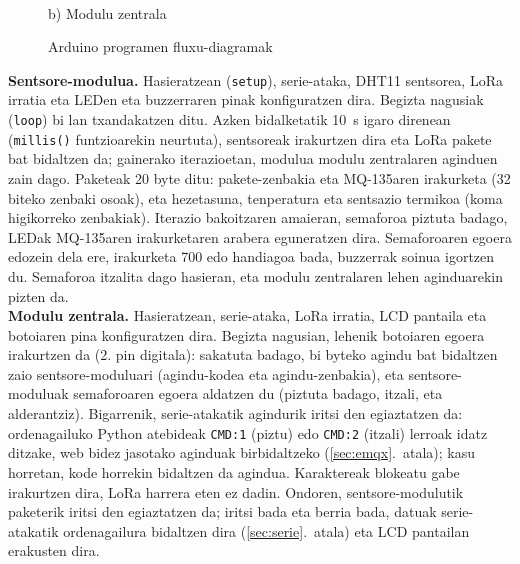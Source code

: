 \documentclass[10pt]{article}
\begin{document}
\begin{figure}[!htbp]
\begin{minipage}[t]{0.5\textwidth}
\\[1mm]
{\footnotesize b) Modulu zentrala}
\end{minipage}
\caption{Arduino programen fluxu-diagramak}
\label{fig:fluxua}
\end{figure}

\textbf{Sentsore-modulua.} Hasieratzean (\texttt{setup}), serie-ataka, DHT11 sentsorea, \ac{LoRa} irratia eta LEDen eta buzzerraren pinak konfiguratzen dira. Begizta nagusiak (\texttt{loop}) bi lan txandakatzen ditu. Azken bidalketatik 10~s igaro direnean (\texttt{millis()} funtzioarekin neurtuta), sentsoreak irakurtzen dira eta \ac{LoRa} pakete bat bidaltzen da; gainerako iterazioetan, modulua modulu zentralaren aginduen zain dago. Paketeak 20 byte ditu: pakete-zenbakia eta MQ-135aren irakurketa (32 biteko zenbaki osoak), eta hezetasuna, tenperatura eta sentsazio termikoa (koma higikorreko zenbakiak). Iterazio bakoitzaren amaieran, semaforoa piztuta badago, LEDak MQ-135aren irakurketaren arabera eguneratzen dira. Semaforoaren egoera edozein dela ere, irakurketa 700 edo handiagoa bada, buzzerrak soinua igortzen du. Semaforoa itzalita dago hasieran, eta modulu zentralaren lehen aginduarekin pizten da.\\

\textbf{Modulu zentrala.} Hasieratzean, serie-ataka, \ac{LoRa} irratia, \ac{LCD} pantaila eta botoiaren pina konfiguratzen dira. Begizta nagusian, lehenik botoiaren egoera irakurtzen da (2. pin digitala): sakatuta badago, bi byteko agindu bat bidaltzen zaio sentsore-moduluari (agindu-kodea eta agindu-zenbakia), eta sentsore-moduluak semaforoaren egoera aldatzen du (piztuta badago, itzali, eta alderantziz). Bigarrenik, serie-atakatik agindurik iritsi den egiaztatzen da: ordenagailuko Python atebideak \texttt{CMD:1} (piztu) edo \texttt{CMD:2} (itzali) lerroak idatz ditzake, web bidez jasotako aginduak birbidaltzeko (\ref{sec:emqx}.~atala); kasu horretan, kode horrekin bidaltzen da agindua. Karaktereak blokeatu gabe irakurtzen dira, \ac{LoRa} harrera eten ez dadin. Ondoren, sentsore-modulutik paketerik iritsi den egiaztatzen da; iritsi bada eta berria bada, datuak serie-atakatik ordenagailura bidaltzen dira (\ref{sec:serie}.~atala) eta \ac{LCD} pantailan erakusten dira.\\
\end{document}
